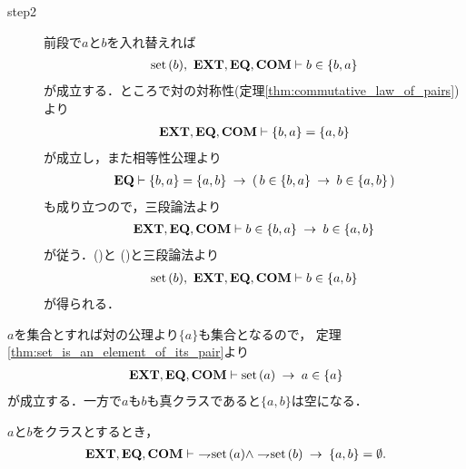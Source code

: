 \begin{sketch}
\begin{description}
			\item[step2]
				前段で$a$と$b$を入れ替えれば
				\begin{align}
					\operatorname*{set}\hspace{0.15em}(b),\ \mbox{{\bf EXT}},\mbox{{\bf EQ}},\mbox{\bf COM} \vdash b \in \{b,a\}
					\label{fom:set_is_an_element_of_its_pair_3}
				\end{align}
				が成立する．ところで対の対称性(定理\ref{thm:commutative_law_of_pairs})より
				\begin{align}
					\mbox{{\bf EXT}},\mbox{{\bf EQ}},\mbox{\bf COM} \vdash \{b,a\} = \{a,b\}
				\end{align}
				が成立し，また相等性公理より
				\begin{align}
					\mbox{{\bf EQ}} \vdash \{b,a\} = \{a,b\}
					\hspace{0.25em}\rightarrow\hspace{0.25em} (\, b \in \{b,a\} \hspace{0.25em}\rightarrow\hspace{0.25em} b \in \{a,b\}\, )
				\end{align}
				も成り立つので，三段論法より
				\begin{align}
					\mbox{{\bf EXT}},\mbox{{\bf EQ}},\mbox{\bf COM} \vdash b \in \{b,a\} \hspace{0.25em}\rightarrow\hspace{0.25em} b \in \{a,b\}
					\label{fom:set_is_an_element_of_its_pair_4}
				\end{align}
				が従う．()と
				()と三段論法より
				\begin{align}
					\operatorname*{set}\hspace{0.15em}(b),\ \mbox{{\bf EXT}},\mbox{{\bf EQ}},\mbox{\bf COM} \vdash b \in \{a,b\}
				\end{align}
				が得られる．
				\QED
		\end{description}
	\end{sketch}
	
	$a$を集合とすれば対の公理より$\{a\}$も集合となるので，
	定理\ref{thm:set_is_an_element_of_its_pair}より
	\begin{align}
		\mbox{{\bf EXT}},\mbox{{\bf EQ}},\mbox{\bf COM} \vdash \operatorname*{set}\hspace{0.15em}(a) \hspace{0.25em}\rightarrow\hspace{0.25em} a \in \{a\}
	\end{align}
	が成立する．一方で$a$も$b$も真クラスであると$\{a,b\}$は空になる．
	
	\begin{screen}
		\begin{thm}[真クラス同士の対は空]\label{thm:pair_of_proper_classes_is_emptyset}
			$a$と$b$をクラスとするとき，
			\begin{align}
				\EXTAX,\EQAX,\COMAX \vdash\ 
				\negation \set{a} \wedge \negation \set{b} \rarrow \{a,b\} = \emptyset.
			\end{align}
		\end{thm}
	\end{screen}
	
